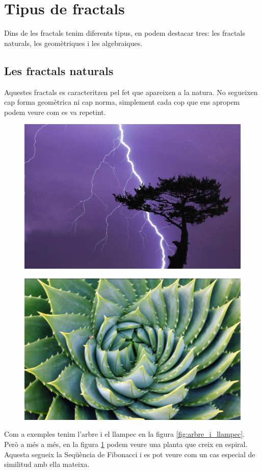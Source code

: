 \section{Tipus de fractals}
Dins de les fractals tenim diferents tipus, en podem destacar tres: les fractals naturals, les geomètriques i les algebraiques.

\subsection{Les fractals naturals}
Aquestes fractals es caracteritzen pel fet que apareixen a la natura. No segueixen cap forma geomètrica ni cap norma, simplement cada cop que ens apropem podem veure com es va repetint.
\newline

\begin{figure}[h]
    \centering
    \begin{minipage}{.5\textwidth}
      \centering
      \includegraphics[width=.8\linewidth]{imatges/dos-fractals-naturals.jpg}
      \label{fig:arbre_i_llampec}
    \end{minipage}%
    \begin{minipage}{.5\textwidth}
      \centering
      \includegraphics[width=.8\linewidth]{imatges/planta-espiral.jpg}
      \label{fig:espiral}
    \end{minipage}
\end{figure}
\noindent
Com a exemples tenim l'arbre i el llampec en la figura \ref{fig:arbre_i_llampec}. Però a més a més, en la figura \ref{fig:espiral} podem veure una planta que creix en espiral. Aquesta segueix la Seqüència de Fibonacci i es pot veure com un cas especial de similitud amb ella mateixa.

